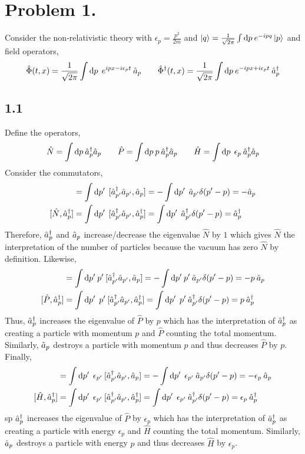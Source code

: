 \documentclass[12pt]{extarticle}
\newcommand{\field}{\hat{\Phi}}
\newcommand{\dfield}{\hat{\Phi}^\dagger}
\begin{document}
 
\section*{Problem 1.}
Consider the non-relativistic theory with $\epsilon_p = \frac{p^2}{2m}$ and $\left| q \right> = \frac{1}{\sqrt{2 \pi}} \int \mathrm{d}p \: e^{-ipq} \left| p \right>$ and field operators,
\[ \field(t, x) = \frac{1}{\sqrt{2 \pi}} \int \d{p} \: e^{ipx - i \epsilon_p t} \: \a_p \quad \quad \dfield(t, x) = \frac{1}{\sqrt{2 \pi}} \int \d{p} e^{- i px + i \epsilon_p t} \: \adag_p\]
\subsection*{1.1}
Define the operators, 
\[ \hat{N} = \int \mathrm{d}p \: \hat{a}^\dagger_p \hat{a}_p \quad \quad \hat{P} = \int \mathrm{d}p \:  p \: \hat{a}^\dagger_p \hat{a}_p \quad \quad \hat{H} = \int \mathrm{d}p \: \: \epsilon_p \: \hat{a}^\dagger_p \hat{a}_p \]
Consider the commutators,
\begin{align*}
[\hat{N}, \a_p] & = \int \d{p'} \: [\adag_{p'} \a_{p'}, \a_p] = - \int \d{p'} \: \a_{p'} \delta(p' - p) = - \a_p \\
[\hat{N}, \adag_p] & = \int \d{p'} \: [\adag_{p'} \a_{p'}, \adag_p] = \int \d{p'} \: \adag_{p'} \delta(p' - p) = \adag_p
\end{align*}
Therefore, $\hat{a}^\dagger_p$ and $\hat{a}_p$ increase/decrease the eigenvalue $\hat{N}$ by $1$ which gives $\hat{N}$ the interpretation of the number of particles because the vacuum has zero $\hat{N}$ by definition. Likewise,
\begin{align*}
[\hat{P}, \a_p] & = \int \d{p'} p' \: [\adag_{p'} \a_{p'}, \a_p] = - \int \d{p'} p' \: \a_{p'} \delta(p' - p) = -p \: \a_p \\
[\hat{P}, \adag_p] & = \int \d{p'} \: p' \: [\adag_{p'} \a_{p'}, \adag_p] = \int \d{p'} \: p' \: \adag_{p'} \delta(p' - p) = p \: \adag_p
\end{align*}
Thus, $\hat{a}^\dagger_p$ increases the eigenvalue of $\hat{P}$ by $p$ which has the interpretation of $\hat{a}^\dagger_p$ as creating a particle with momentum $p$ and $\hat{P}$ counting the total momentum. Similarly, $\hat{a}_p$ destroys a particle with momentum $p$ and thus decreases $\hat{P}$ by $p$. Finally,
\begin{align*}
[\hat{H}, \a_p] & = \int \d{p'} \: \epsilon_{p'} \: [\adag_{p'} \a_{p'}, \a_p] = - \int \d{p'} \: \epsilon_{p'} \: \a_{p'} \delta(p' - p) = -\epsilon_{p} \: \a_p \\
[\hat{H}, \adag_p] & = \int \d{p'} \: \epsilon_{p'} \: [\adag_{p'} \a_{p'}, \adag_p] = \int \d{p'} \: \epsilon_{p'} \: \adag_{p'} \delta(p' - p) = \epsilon_{p} \: \adag_p
\end{align*}
sp $\hat{a}^\dagger_p$ increases the eigenvalue of $\hat{P}$ by $\epsilon_p$ which has the interpretation of $\hat{a}^\dagger_p$ as creating a particle with energy $\epsilon_p$ and $\hat{H}$ counting the total momentum. Similarly, $\hat{a}_p$ destroys a particle with energy $p$ and thus decreases $\hat{H}$ by $\epsilon_p$.
\end{document}

